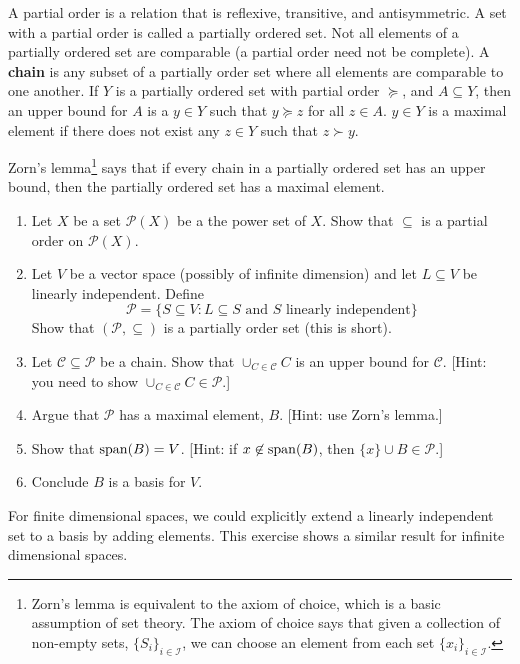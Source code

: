 \begin{exercise}[Difficult]\label{ex:basis}
  A partial order is a relation that is reflexive, transitive, and
  antisymmetric. A set with a partial order is called a partially
  ordered set. Not all elements of a partially ordered set are
  comparable (a partial order need not be complete). A \textbf{chain}
  is any subset of a partially order set where all elements are
  comparable to one another. If $Y$ is a partially ordered set with
  partial order $\succeq$, and $A \subseteq Y$, then an upper bound
  for $A$ is a $y \in Y$ such that $y \succeq z$ for all $z \in A$.
  $y \in Y$ is a maximal element if there does not exist any $z \in Y$
  such that $z \succ y$.
  
  Zorn's lemma\footnote{Zorn's lemma is equivalent to the axiom of
    choice, which is a basic assumption of set theory. The axiom of
    choice says that given a collection of non-empty sets,
    $\{S_i\}_{i \in \mathcal{I}}$, we can choose an element from each
    set $\{x_i\}_{i \in \mathcal{I}}$.} says that if every chain in a
  partially ordered set has an upper bound, then the partially ordered
  set has a maximal element.
  \begin{enumerate}
  \item Let $X$ be a set $\mathcal{P}(X)$ be a the power set of
    $X$. Show that $\subseteq$ is a partial order on $\mathcal{P}(X)$.
  \item Let $V$ be a vector space (possibly of infinite dimension) and
    let $L \subseteq V$ be linearly independent. Define 
    \[ \mathcal{P} = \{S \subseteq V: L \subseteq S \text{ and } S
    \text{ linearly independent}\} \]
    Show that $(\mathcal{P},\subseteq)$ is a partially order set (this is
    short).
  \item Let $\mathcal{C} \subseteq \mathcal{P}$ be a chain. Show that
    $\cup_{C \in \mathcal{C}} C$ is an upper bound for
    $\mathcal{C}$. [Hint: you need to show $\cup_{C \in \mathcal{C}} C
    \in \mathcal{P}$.]
  \item Argue that $\mathcal{P}$ has a maximal element, $B$. [Hint:
    use Zorn's lemma.]
  \item Show that $\mathrm{span}(B) = V$. [Hint: if $x \not\in \mathrm{span}(B)$, then
    $\{x\} \cup B \in \mathcal{P}$.]
  \item Conclude $B$ is a basis for $V$.
  \end{enumerate}
  For finite dimensional spaces, we could explicitly extend a linearly
  independent set to a basis by adding elements. This exercise shows a
  similar result for infinite dimensional spaces.
\end{exercise}

